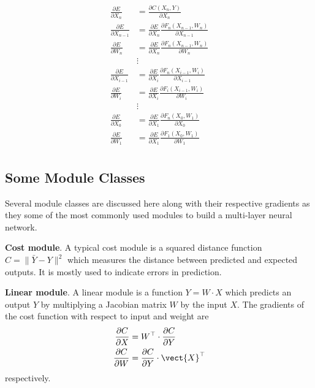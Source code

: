 \begin{align*}
 \frac{\partial E}{\partial X_n} &= \frac{\partial C(X_n, Y)}{\partial X_n}\\
 \frac{\partial E}{\partial X_{n-1}} &=\frac{\partial E}{\partial X_n} \frac{\partial F_n(X_{n-1},W_n)}{\partial X_{n-1}} \\
 \frac{\partial E}{\partial W_n} &=\frac{\partial E}{\partial X_n} \frac{\partial F_n(X_{n-1},W_n)}{\partial W_n} \\
 &\vdots\\
 \frac{\partial E}{\partial X_{i-1}} &=\frac{\partial E}{\partial X_i} \frac{\partial F_n(X_{i-1},W_i)}{\partial X_{i-1}} \\
 \frac{\partial E}{\partial W_i} &=\frac{\partial E}{\partial X_i} \frac{\partial F_i(X_{i-1},W_i)}{\partial W_i} \\
   &\vdots\\
 \frac{\partial E}{\partial X_0} &=\frac{\partial E}{\partial X_1} \frac{\partial F_n(X_0,W_1)}{\partial X_0} \\
 \frac{\partial E}{\partial W_1} &=\frac{\partial E}{\partial X_1} \frac{\partial F_1(X_0,W_1)}{\partial W_1} \\
\end{align*}

\subsection{Some Module Classes}\label{ssc:Module Classes}

Several module classes are discussed here along with their respective gradients as they some of the most commonly used modules to build a multi-layer neural network.

\textbf{Cost module}.
A typical cost module is a squared distance function $C=\|\bar{Y}-Y\|^2$ which measures the distance between predicted and expected outputs.
It is mostly used to indicate errors in prediction.

\textbf{Linear module}.
A linear module is a function $Y=W\cdot X$ which predicts an output $Y$ by multiplying a Jacobian matrix $W$ by the input $X$.
The gradients of the cost function with respect to input and weight are
\begin{align*}
    \frac{\partial C}{\partial X} &= W^\top \cdot \frac{\partial C}{\partial Y} \\
    \frac{\partial C}{\partial W} &= \frac{\partial C}{\partial Y}  \cdot \vect{X}^\top
\end{align*}
respectively.


